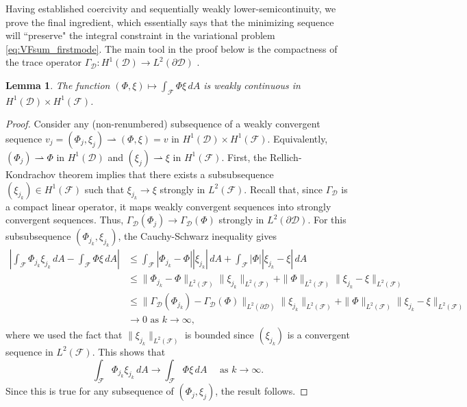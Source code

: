 \documentclass[letterpaper, 12pt]{amsart}
\newtheorem{lemma}[definition]{Lemma}
\newcommand{\D}{\mathcal{D}}
\newcommand{\F}{\mathcal{F}}
\begin{document}
Having established coercivity and sequentially weakly lower-semicontinuity, we prove the final  ingredient, which essentially says that the minimizing sequence will ``preserve" the integral constraint in the variational problem \eqref{eq:VFsum_firstmode}. The main tool in the proof below is the compactness of the trace operator $\Gamma_\D\colon H^1(\D)\longrightarrow L^2(\partial\D)$ \cite[pp 103]{Necas:2011aa}. 


\begin{lemma}\label{thm:CoV_WC}
The function $(\Phi,\xi)\mapsto\displaystyle\int_\F \Phi\xi\, dA$ is weakly continuous in $H^1(\D)\times H^1(\F)$. 
\end{lemma}
\begin{proof}
Consider any (non-renumbered) subsequence of a weakly convergent sequence $v_j=(\Phi_j,\xi_j)\rightharpoonup (\Phi,\xi)=v$ in $H^1(\D)\times H^1(\F)$. Equivalently, $(\Phi_j)\rightharpoonup\Phi$ in $H^1(\D)$ and $(\xi_j)\rightharpoonup\xi$ in $H^1(\F)$. First, the Rellich-Kondrachov theorem implies that there exists a subsubsequence $(\xi_{j_k})\in H^1(\F)$ such that $\xi_{j_k}\longrightarrow\xi$ strongly in $L^2(\F)$. Recall that, since $\Gamma_\D$  is a compact linear operator, it maps weakly convergent sequences into strongly convergent sequences. Thus, $\Gamma_\D(\Phi_j)\longrightarrow\Gamma_\D(\Phi)$ strongly in $L^2(\partial\D)$. For this subsubsequence $(\Phi_{j_k},\xi_{j_k})$, the Cauchy-Schwarz inequality gives
\begin{align*}
\left|\int_\F\Phi_{j_k}\xi_{j_k}\, dA - \int_\F\Phi\xi\, dA\right| & \le \int_\F|\Phi_{j_k}-\Phi||\xi_{j_k}|\, dA + \int_\F|\Phi||\xi_{j_k}-\xi|\, dA\\
& \le \|\Phi_{j_k}-\Phi\|_{L^2(\F)}\|\xi_{j_k}\|_{L^2(\F)} + \|\Phi\|_{L^2(\F)}\|\xi_{j_k}-\xi\|_{L^2(\F)}\\
& \le \|\Gamma_\D(\Phi_{j_k})-\Gamma_\D(\Phi)\|_{L^2(\partial\D)}  \| \xi_{j_k}\|_{L^2(\F)} 
+ \|\Phi\|_{L^2(\F)} \|\xi_{j_k}-\xi\|_{L^2(\F)} \\ 
& \longrightarrow 0\textrm{ as }k\longrightarrow\infty,
\end{align*}
where we  used the fact that $\|\xi_{j_k}\|_{L^2(\F)}$ is bounded since $(\xi_{j_k})$ is a convergent sequence in $L^2(\F)$. This shows that
\[ \int_\F\Phi_{j_k}\xi_{j_k}\, dA\longrightarrow \int_\F\Phi\xi\, dA\quad\textrm{ as }k\longrightarrow\infty. \]
Since this is true for any subsequence of $(\Phi_j,\xi_j)$, the result follows. 
\end{proof}
\end{document}
